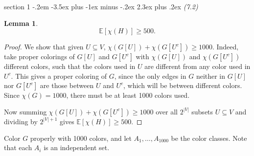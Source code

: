 \documentclass[12pt]{article}
\makeatletter
\theoremstyle{norm}
\newtheorem{lem}[thm]{Lemma}
\newcommand{\E}[0]{\mathbb{E}}
\newcommand{\subeq}[0]{\subseteq}
\newcommand{\ba}[1]{\left[ {#1} \right]}
\newcommand{\pa}[1]{\left( {#1} \right)}
\newenvironment{problem}{\@startsection
       {section}
       {1}
       {-.2em}
       {-3.5ex plus -1ex minus -.2ex}
       {2.3ex plus .2ex}
       {\pagebreak[3]%
       \large\bf\noindent{Problem }
       }
       }
       {%
       }
\makeatother
\begin{document}
\begin{problem} {\it (7.2)}
\begin{lem}
\[\E[\chi(H)]\ge 500.\]
\end{lem}
\begin{proof}
We show that given $U\subeq V$, $\chi(G[U])+\chi(G[U^c])\ge 1000$. Indeed, take proper colorings of $G[U]$ and $G[U^c]$ with $\chi(G[U])$ and $\chi(G[U^c])$ different colors, such that the colors used in $U$ are different from any color used in $U^c$. This gives a proper coloring of $G$, since the only edges in $G$ neither in $G[U]$ nor $G[U^c]$ are those between $U$ and $U^c$, which will be between different colors. Since $\chi(G)=1000$, there must be at least 1000 colors used.

Now summing $\chi(G[U])+\chi(G[U^c])\ge 1000$ over all $2^{|V|}$ subsets $U\subeq V$ and dividing by $2^{|V|+1}$ gives $\E[\chi(H)]\ge 500$.
\end{proof}

Color $G$ properly with 1000 colors, and let $A_1,\ldots, A_{1000}$ be the color classes. Note that each $A_i$ is an independent set. 


\end{problem}
\end{document}
